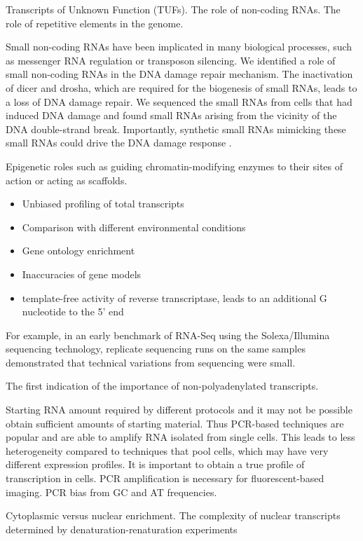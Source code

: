 Transcripts of Unknown Function (TUFs). The role of non-coding RNAs. The role of repetitive elements in the genome.

Small non-coding RNAs have been implicated in many biological processes, such as messenger RNA regulation or transposon silencing. We identified a role of small non-coding RNAs in the DNA damage repair mechanism. The inactivation of dicer and drosha, which are required for the biogenesis of small RNAs, leads to a loss of DNA damage repair. We sequenced the small RNAs from cells that had induced DNA damage and found small RNAs arising from the vicinity of the DNA double-strand break. Importantly, synthetic small RNAs mimicking these small RNAs could drive the DNA damage response \cite{francia2012site}.

Epigenetic roles such as guiding chromatin-modifying enzymes to their sites of action or acting as scaffolds.

\begin{itemize}
   \item Unbiased profiling of total transcripts
   \item Comparison with different environmental conditions
   \item Gene ontology enrichment
   \item Inaccuracies of gene models
   \item template-free activity of reverse transcriptase, leads to an additional G nucleotide to the 5' end
\end{itemize}

For example, in an early benchmark of RNA-Seq using the Solexa/Illumina sequencing technology, replicate sequencing runs on the same samples demonstrated that technical variations from sequencing were small\cite{pmid18550803}.

The first indication of the importance of non-polyadenylated transcripts\cite{pmid4213457}.

Starting RNA amount required by different protocols and it may not be possible obtain sufficient amounts of starting material. Thus PCR-based techniques are popular and are able to amplify RNA isolated from single cells. This leads to less heterogeneity compared to techniques that pool cells, which may have very different expression profiles. It is important to obtain a true profile of transcription in cells. PCR amplification is necessary for fluorescent-based imaging. PCR bias from GC and AT frequencies.

Cytoplasmic versus nuclear enrichment. The complexity of nuclear transcripts determined by denaturation-renaturation experiments\cite{pmid5969070}

